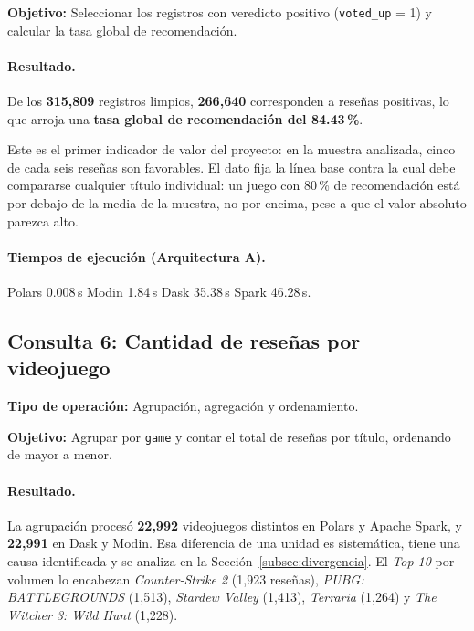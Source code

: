 \textbf{Objetivo:} Seleccionar los registros con veredicto positivo (\texttt{voted\_up} = 1) y calcular la tasa global de recomendación.


\paragraph{Resultado.}
De los \textbf{315,809} registros limpios, \textbf{266,640} corresponden a reseñas positivas, lo que arroja una \textbf{tasa global de recomendación del 84.43\,\%}.

Este es el primer indicador de valor del proyecto: en la muestra analizada, cinco de cada seis reseñas son favorables. El dato fija la línea base contra la cual debe compararse cualquier título individual: un juego con 80\,\% de recomendación está por debajo de la media de la muestra, no por encima, pese a que el valor absoluto parezca alto.

\paragraph{Tiempos de ejecución (Arquitectura A).}
Polars 0.008\,s \textbar{} Modin 1.84\,s \textbar{} Dask 35.38\,s \textbar{} Spark 46.28\,s.



\subsection{Consulta 6: Cantidad de reseñas por videojuego}

\textbf{Tipo de operación:} Agrupación, agregación y ordenamiento.

\textbf{Objetivo:} Agrupar por \texttt{game} y contar el total de reseñas por título, ordenando de mayor a menor.


\paragraph{Resultado.}
La agrupación procesó \textbf{22,992} videojuegos distintos en Polars y Apache Spark, y \textbf{22,991} en Dask y Modin. Esa diferencia de una unidad es sistemática, tiene una causa identificada y se analiza en la Sección~\ref{subsec:divergencia}. El \textit{Top 10} por volumen lo encabezan \textit{Counter-Strike 2} (1,923 reseñas), \textit{PUBG: BATTLEGROUNDS} (1,513), \textit{Stardew Valley} (1,413), \textit{Terraria} (1,264) y \textit{The Witcher 3: Wild Hunt} (1,228).

